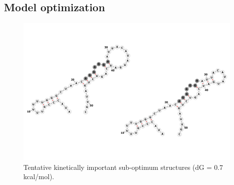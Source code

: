 \documentclass[11pt, a4paper]{article}
\begin{document}
\subsection{Model optimization}
\begin{figure}
\centering
\includegraphics[width=\linewidth]{folding_example_grey_compare.png}
\caption{Tentative kinetically important sub-optimum structures (dG = 0.7 kcal/mol).}
\label{fig:RNA_p_unbound_base[-14]_k_tuning}
\end{figure}






\small


\end{document}
